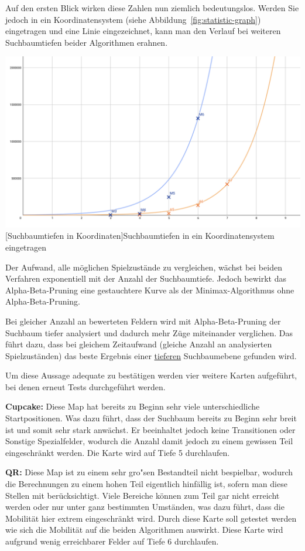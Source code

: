 Auf den ersten Blick wirken diese Zahlen nun ziemlich bedeutungslos.
Werden Sie jedoch in ein Koordinatensystem (siehe Abbildung~\ref{fig:statistic-graph}) eingetragen und eine Linie eingezeichnet, kann man den Verlauf bei weiteren Suchbaumtiefen beider Algorithmen erahnen.

\vspace{1em}
\begin{minipage}{\linewidth}
    \centering
    \includegraphics[width=0.7\linewidth]{pics/statistic-graph}
    [Suchbaumtiefen in Koordinaten]{Suchbaumtiefen in ein Koordinatensystem eingetragen}
    \label{fig:statistic-graph}
\end{minipage}

Der Aufwand, alle m\"oglichen Spielzust\"ande zu vergleichen, w\"achst bei beiden Verfahren exponentiell mit der Anzahl der Suchbaumtiefe.
Jedoch bewirkt das Alpha-Beta-Pruning eine gestauchtere Kurve als der Minimax-Algorithmus ohne Alpha-Beta-Pruning.

Bei gleicher Anzahl an bewerteten Feldern wird mit Alpha-Beta-Pruning der Suchbaum tiefer analysiert und dadurch mehr Z\"uge miteinander verglichen.
Das f\"uhrt dazu, dass bei gleichem Zeitaufwand (\corresponds gleiche Anzahl an analysierten Spielzust\"anden) das beste Ergebnis einer \underline{tieferen} Suchbaumebene gefunden wird.

Um diese Aussage adequate zu best\"atigen werden vier weitere Karten aufgef\"uhrt, bei denen erneut Tests durchgef\"uhrt werden.

\textbf{Cupcake:}
Diese Map hat bereits zu Beginn sehr viele unterschiedliche Startpositionen.
Was dazu f\"uhrt, dass der Suchbaum bereits zu Beginn sehr breit ist und somit sehr stark anw\"achst.
Er beeinhaltet jedoch keine Transitionen oder Sonstige Spezialfelder, wodurch die Anzahl damit jedoch zu einem gewissen Teil eingeschr\"ankt werden.
Die Karte wird auf Tiefe 5 durchlaufen.

\textbf{QR:}
Diese Map ist zu einem sehr gro"sen Bestandteil nicht bespielbar, wodurch die Berechnungen zu einem hohen Teil eigentlich hinf\"allig ist, sofern man diese Stellen mit ber\"ucksichtigt.
Viele Bereiche k\"onnen zum Teil gar nicht erreicht werden oder nur unter ganz bestimmten Umst\"anden, was dazu f\"uhrt, dass die Mobilit\"at hier extrem eingeschr\"ankt wird.
Durch diese Karte soll getestet werden wie sich die Mobilit\"at auf die beiden Algorithmen auswirkt.
Diese Karte wird aufgrund wenig erreichbarer Felder auf Tiefe 6 durchlaufen.

